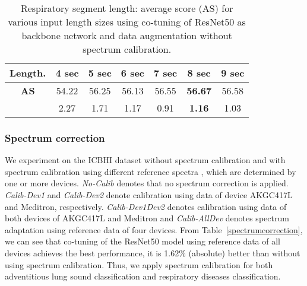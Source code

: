 \documentclass[journal]{IEEEtran}
\begin{document}
\begin{table}[t]
        \renewcommand{\arraystretch}{1.3}
        \caption{Respiratory segment length: average score (AS) for various input length sizes using co-tuning of ResNet50 as backbone network and data augmentation without spectrum calibration.}
        \label{fixedlength}
        \centering
        \scalebox{0.85} {
        \begin{tabular}{c c c c c c c}
            \hline
            \textbf{Length.}  & \textbf{4 sec} & \textbf{5 sec} & \textbf{6 sec} & \textbf{7 sec} & \textbf{8 sec} & \textbf{9 sec} \\
            \hline
            \textbf{AS} & 54.22 & 56.25 & 56.13 & 56.55 & \textbf{56.67} & 56.58\\
               &  2.27 &  1.71 &  1.17 &  0.91 &  \textbf{1.16} &  1.03\\
            \hline
        \end{tabular}}
    \end{table}

   
\subsubsection{Spectrum correction}
We experiment on the ICBHI dataset without spectrum calibration and with spectrum calibration using different reference spectra , which are determined by one or more devices. \textit{No-Calib} denotes that no spectrum correction is applied. \textit{Calib-Dev1} and \textit{Calib-Dev2} denote calibration using data of device AKGC417L and Meditron, respectively. \textit{Calib-Dev1Dev2} denotes calibration using data of both devices of AKGC417L and Meditron and \textit{Calib-AllDev} denotes spectrum adaptation using reference data of four devices. From Table~\ref{spectrumcorrection}, we can see that co-tuning of the ResNet50 model using reference data of all devices achieves the best performance, it is 1.62\% (absolute) better than without using spectrum calibration. Thus, we apply spectrum calibration for both adventitious lung sound classification and respiratory diseases classification.
\begin{table}[t]
    \renewcommand{\arraystretch}{1.3}
    \caption{Comparison of spectrum correction methods using different reference data. Co-tuning of the ResNet50 with data augmentation is used.}
    \label{spectrumcorrection}
    \centering
    \end{table}
\end{document}
